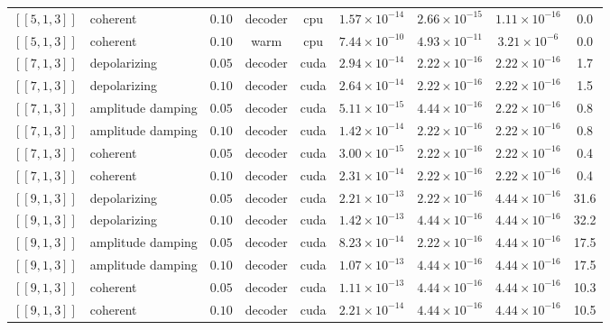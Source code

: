 \documentclass[10pt,a4paper]{article}
\begin{document}
\begin{longtable}{lllcclccc}
$[\![5,1,3]\!]$ & coherent & $0.10$ & decoder & cpu & $1.57\times 10^{-14}$ & $2.66\times 10^{-15}$ & $1.11\times 10^{-16}$ & 0.0 \\
$[\![5,1,3]\!]$ & coherent & $0.10$ & warm & cpu & $7.44\times 10^{-10}$ & $4.93\times 10^{-11}$ & $3.21\times 10^{-6}$ & 0.0 \\
$[\![7,1,3]\!]$ & depolarizing & $0.05$ & decoder & cuda & $2.94\times 10^{-14}$ & $2.22\times 10^{-16}$ & $2.22\times 10^{-16}$ & 1.7 \\
$[\![7,1,3]\!]$ & depolarizing & $0.10$ & decoder & cuda & $2.64\times 10^{-14}$ & $2.22\times 10^{-16}$ & $2.22\times 10^{-16}$ & 1.5 \\
$[\![7,1,3]\!]$ & amplitude damping & $0.05$ & decoder & cuda & $5.11\times 10^{-15}$ & $4.44\times 10^{-16}$ & $2.22\times 10^{-16}$ & 0.8 \\
$[\![7,1,3]\!]$ & amplitude damping & $0.10$ & decoder & cuda & $1.42\times 10^{-14}$ & $2.22\times 10^{-16}$ & $2.22\times 10^{-16}$ & 0.8 \\
$[\![7,1,3]\!]$ & coherent & $0.05$ & decoder & cuda & $3.00\times 10^{-15}$ & $2.22\times 10^{-16}$ & $2.22\times 10^{-16}$ & 0.4 \\
$[\![7,1,3]\!]$ & coherent & $0.10$ & decoder & cuda & $2.31\times 10^{-14}$ & $2.22\times 10^{-16}$ & $2.22\times 10^{-16}$ & 0.4 \\
$[\![9,1,3]\!]$ & depolarizing & $0.05$ & decoder & cuda & $2.21\times 10^{-13}$ & $2.22\times 10^{-16}$ & $4.44\times 10^{-16}$ & 31.6 \\
$[\![9,1,3]\!]$ & depolarizing & $0.10$ & decoder & cuda & $1.42\times 10^{-13}$ & $4.44\times 10^{-16}$ & $4.44\times 10^{-16}$ & 32.2 \\
$[\![9,1,3]\!]$ & amplitude damping & $0.05$ & decoder & cuda & $8.23\times 10^{-14}$ & $2.22\times 10^{-16}$ & $4.44\times 10^{-16}$ & 17.5 \\
$[\![9,1,3]\!]$ & amplitude damping & $0.10$ & decoder & cuda & $1.07\times 10^{-13}$ & $4.44\times 10^{-16}$ & $4.44\times 10^{-16}$ & 17.5 \\
$[\![9,1,3]\!]$ & coherent & $0.05$ & decoder & cuda & $1.11\times 10^{-13}$ & $4.44\times 10^{-16}$ & $4.44\times 10^{-16}$ & 10.3 \\
$[\![9,1,3]\!]$ & coherent & $0.10$ & decoder & cuda & $2.21\times 10^{-14}$ & $4.44\times 10^{-16}$ & $4.44\times 10^{-16}$ & 10.5 \\
\bottomrule\end{longtable}
\end{document}
